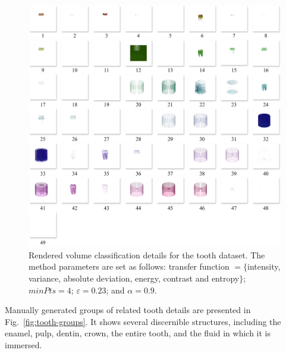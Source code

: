 \begin{figure}[htb!]
    \centering
    \includegraphics[width=\columnwidth]{figs/tooth-clusters.jpg} 
    \caption{Rendered volume classification details for the tooth dataset. The method parameters are set as follows: transfer function $ =\{$intensity, variance, absolute deviation, energy, contrast and entropy$\}$; $minPts = 4$; $\varepsilon = 0.23$; and $\alpha = 0.9$.}
    \label{fig:tooth-clusters}
\end{figure}


Manually generated groups of related tooth details are presented in Fig.~\ref{fig:tooth-groups}.  It shows several discernible structures, including the enamel, pulp, dentin, crown, the entire tooth, and the fluid in which it is immersed.

